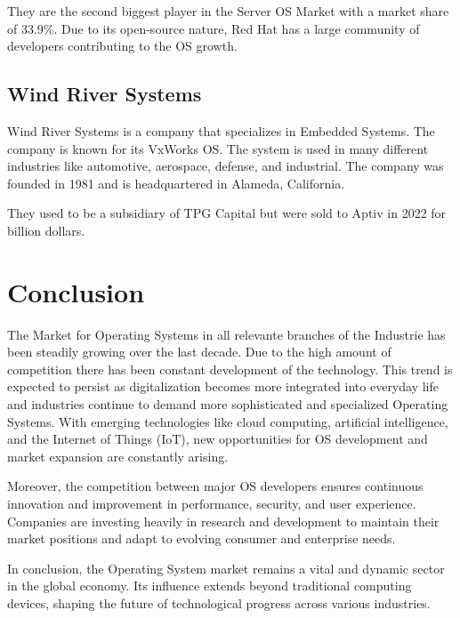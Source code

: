They are the second biggest player in the Server OS Market with a market share of 33.9\%. 
Due to its open-source nature, Red Hat has a large community of developers contributing to the OS growth.

\cite{RedHatWiki}

\subsection{Wind River Systems}

Wind River Systems is a company that specializes in Embedded Systems. The company is known for its VxWorks OS. The system is used in many different industries like automotive, aerospace, defense, and industrial.
The company was founded in 1981 and is headquartered in Alameda, California.

They used to be a subsidiary of TPG Capital but were sold to Aptiv in 2022 for  billion dollars.

\cite{WindriverSold}
\cite{Windriver}


\section{Conclusion}

The Market for Operating Systems in all relevante branches of the Industrie has been steadily growing over the last decade.
Due to the high amount of competition there has been constant development of the technology. 
This trend is expected to persist as digitalization becomes more integrated into everyday life and industries continue to demand more sophisticated and specialized Operating Systems. With emerging technologies like cloud computing, artificial intelligence, and the Internet of Things (IoT), new opportunities for OS development and market expansion are constantly arising.

Moreover, the competition between major OS developers ensures continuous innovation and improvement in performance, security, and user experience. Companies are investing heavily in research and development to maintain their market positions and adapt to evolving consumer and enterprise needs.

In conclusion, the Operating System market remains a vital and dynamic sector in the global economy. Its influence extends beyond traditional computing devices, shaping the future of technological progress across various industries.

\author{Florian Prandstetter}
